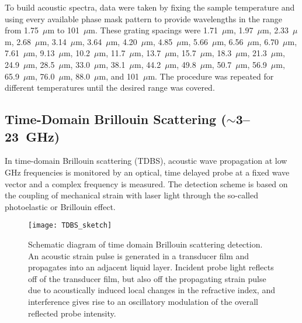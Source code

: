 \documentclass[reprint,showpacs,amsmath,amssymb,aip,jcp]{revtex4-1}
\begin{document}
To build acoustic spectra, data were taken by fixing the sample
temperature and using every available phase mask pattern to provide
wavelengths in the range from 1.75~$\mu$m to 101~$\mu$m. These grating
spacings were 1.71~$\mu$m, 1.97~$\mu$m, 2.33~$\mu$m, 2.68~$\mu$m,
3.14~$\mu$m, 3.64~$\mu$m, 4.20~$\mu$m, 4.85~$\mu$m, 5.66~$\mu$m,
6.56~$\mu$m, 6.70~$\mu$m, 7.61~$\mu$m, 9.13~$\mu$m, 10.2~$\mu$m,
11.7~$\mu$m, 13.7~$\mu$m, 15.7~$\mu$m, 18.3~$\mu$m, 21.3~$\mu$m,
24.9~$\mu$m, 28.5~$\mu$m, 33.0~$\mu$m, 38.1~$\mu$m, 44.2~$\mu$m,
49.8~$\mu$m, 50.7~$\mu$m, 56.9~$\mu$m, 65.9~$\mu$m, 76.0~$\mu$m,
88.0~$\mu$m, and 101~$\mu$m. The procedure was repeated for different
temperatures until the desired range was covered.



\subsection{Time-Domain Brillouin Scattering ($\sim$3--23~GHz)}\label{sec:TDBS}

In time-domain Brillouin scattering (TDBS), acoustic wave
propagation at low GHz frequencies is monitored by an optical,
time delayed probe at a fixed wave vector and a complex frequency
is measured. The detection scheme is based on the coupling of
mechanical strain with laser light through the so-called
photoelastic or Brillouin effect.

\begin{figure}[th!]
  \texttt{[image: TDBS\_sketch]}
  \caption{\label{fig:TDBS_sketch} Schematic diagram of time domain
    Brillouin scattering detection. An acoustic strain pulse is
    generated in a transducer film and propagates into an adjacent
    liquid layer.  Incident probe light reflects off of the transducer
    film, but also off the propagating strain pulse due to
    acoustically induced local changes in the refractive index, and
    interference gives rise to an oscillatory modulation of the
    overall reflected probe intensity.}
\end{figure}
\end{document}
